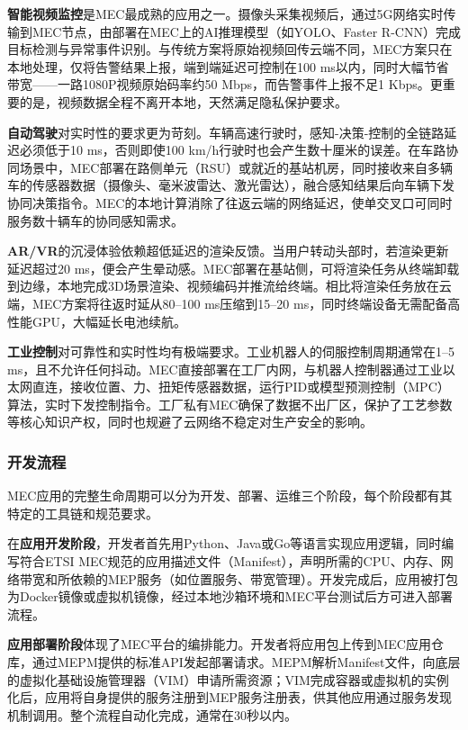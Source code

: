 \textbf{智能视频监控}是MEC最成熟的应用之一。摄像头采集视频后，通过5G网络实时传输到MEC节点，由部署在MEC上的AI推理模型（如YOLO、Faster R-CNN）完成目标检测与异常事件识别。与传统方案将原始视频回传云端不同，MEC方案只在本地处理，仅将告警结果上报，端到端延迟可控制在100 ms以内，同时大幅节省带宽——一路1080P视频原始码率约50 Mbps，而告警事件上报不足1 Kbps。更重要的是，视频数据全程不离开本地，天然满足隐私保护要求。

\textbf{自动驾驶}对实时性的要求更为苛刻。车辆高速行驶时，感知-决策-控制的全链路延迟必须低于10 ms，否则即使100 km/h行驶时也会产生数十厘米的误差。在车路协同场景中，MEC部署在路侧单元（RSU）或就近的基站机房，同时接收来自多辆车的传感器数据（摄像头、毫米波雷达、激光雷达），融合感知结果后向车辆下发协同决策指令。MEC的本地计算消除了往返云端的网络延迟，使单交叉口可同时服务数十辆车的协同感知需求。

\textbf{AR/VR}的沉浸体验依赖超低延迟的渲染反馈。当用户转动头部时，若渲染更新延迟超过20 ms，便会产生晕动感。MEC部署在基站侧，可将渲染任务从终端卸载到边缘，本地完成3D场景渲染、视频编码并推流给终端。相比将渲染任务放在云端，MEC方案将往返时延从80--100 ms压缩到15--20 ms，同时终端设备无需配备高性能GPU，大幅延长电池续航。

\textbf{工业控制}对可靠性和实时性均有极端要求。工业机器人的伺服控制周期通常在1--5 ms，且不允许任何抖动。MEC直接部署在工厂内网，与机器人控制器通过工业以太网直连，接收位置、力、扭矩传感器数据，运行PID或模型预测控制（MPC）算法，实时下发控制指令。工厂私有MEC确保了数据不出厂区，保护了工艺参数等核心知识产权，同时也规避了云网络不稳定对生产安全的影响。

\subsubsection{开发流程}

MEC应用的完整生命周期可以分为开发、部署、运维三个阶段，每个阶段都有其特定的工具链和规范要求。

在\textbf{应用开发阶段}，开发者首先用Python、Java或Go等语言实现应用逻辑，同时编写符合ETSI MEC规范的应用描述文件（Manifest），声明所需的CPU、内存、网络带宽和所依赖的MEP服务（如位置服务、带宽管理）。开发完成后，应用被打包为Docker镜像或虚拟机镜像，经过本地沙箱环境和MEC平台测试后方可进入部署流程。

\textbf{应用部署阶段}体现了MEC平台的编排能力。开发者将应用包上传到MEC应用仓库，通过MEPM提供的标准API发起部署请求。MEPM解析Manifest文件，向底层的虚拟化基础设施管理器（VIM）申请所需资源；VIM完成容器或虚拟机的实例化后，应用将自身提供的服务注册到MEP服务注册表，供其他应用通过服务发现机制调用。整个流程自动化完成，通常在30秒以内。

